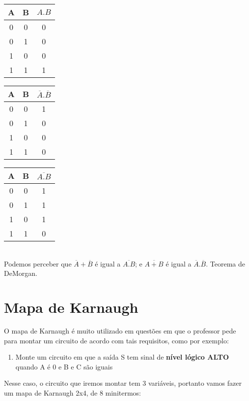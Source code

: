 \documentclass{article}
\begin{document}
			\begin{tabular}{|c|c|c|}
				\hline
				A & B & $A.B$ \\
				\hline
				0 & 0 & 0 \\
				\hline
				0 & 1 & 0 \\
				\hline
				1 & 0 & 0 \\
				\hline
				1 & 1 & 1 \\
				\hline
			\end{tabular}
			\hspace*{1 cm}
			\begin{tabular}{|c|c|c|}
				\hline
				A & B & $\overline{A}.\overline{B}$ \\
				\hline
				0 & 0 & 1 \\
				\hline
				0 & 1 & 0 \\
				\hline
				1 & 0 & 0 \\
				\hline
				1 & 1 & 0 \\
				\hline
			\end{tabular}			
			\hspace*{1 cm}
			\begin{tabular}{|c|c|c|}
				\hline
				A & B & $\overline{A.B}$ \\
				\hline
				0 & 0 & 1 \\
				\hline
				0 & 1 & 1 \\
				\hline
				1 & 0 & 1 \\
				\hline
				1 & 1 & 0 \\
				\hline
			\end{tabular}
			\\
			Podemos perceber que $\overline{A}+\overline{B}$ é igual a $\overline{A.B}$; e $\overline{A+B}$ é igual a $\overline{A}.\overline{B}$. Teorema de DeMorgan.
	\section{Mapa de Karnaugh}		
		O mapa de Karnaugh é muito utilizado em questões em que o professor pede para montar um circuito de acordo com tais requisitos, como por exemplo:\\
		\begin{enumerate}
			\item Monte um circuito em que a saída S tem sinal de \textbf{nível lógico ALTO} quando A é 0 e B e C são iguais
		\end{enumerate}
		Nesse caso, o circuito que iremos montar tem 3 variáveis, portanto vamos fazer um mapa de Karnaugh 2x4, de 8 minitermos:\\
\end{document}
